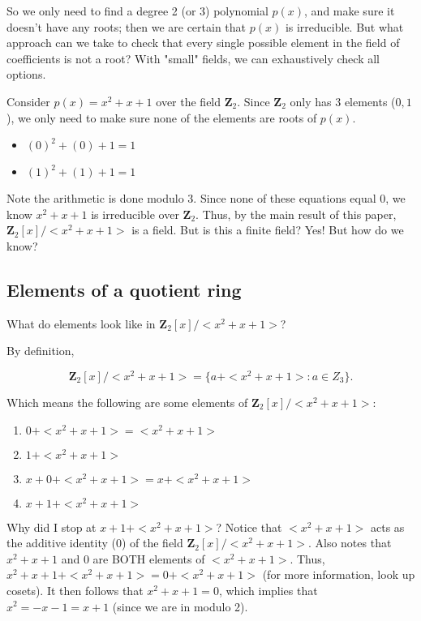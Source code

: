 So we only need to find a degree 2 (or 3) polynomial $p(x)$, and make sure it doesn't have any roots; then we are certain that $p(x)$ is irreducible. But what approach can we take to check that every single possible element in the field of coefficients is not a root? With "small" fields, we can exhaustively check all options. 

Consider $p(x) = x^2 + x + 1$ over the field $\mathbf{Z}_2$. Since $\mathbf{Z}_2$ only has 3 elements ($0, 1$), we only need to make sure none of the elements are roots of $p(x)$.

\begin{itemize}
    \item $(0)^2 + (0) + 1 = 1$
    \item $(1)^2 + (1) + 1 = 1$
\end{itemize}

Note the arithmetic is done modulo 3. Since none of these equations equal 0, we know $x^2 + x + 1$ is irreducible over $\mathbf{Z}_2$. Thus, by the main result of this paper, $\mathbf{Z}_2[x]/<x^2+x+1>$ is a field.
But is this a finite field? Yes! But how do we know?

\subsection{Elements of a quotient ring}

What do elements look like in $\mathbf{Z}_2[x]/<x^2+x+1>$? 

By definition, 

$$\mathbf{Z}_2[x]/<x^2+x+1> = \{a + <x^2 + x + 1> : a \in Z_3 \}.$$

Which means the following are some elements of $\mathbf{Z}_2[x]/<x^2+x+1>$:

\begin{enumerate}
    \item $0 + <x^2 + x + 1> = <x^2 + x + 1>$
    \item $1 + <x^2 + x + 1>$
    \item $x + 0 + <x^2 + x + 1> = x + <x^2 + x + 1>$
    \item $x + 1 + <x^2 + x + 1>$
\end{enumerate}

Why did I stop at $x + 1 + <x^2 + x + 1>$? Notice that $<x^2 + x + 1>$ acts as the additive identity (0) of the field $\mathbf{Z}_2[x]/<x^2+x+1>$. Also notes that $x^2 + x + 1$ and $0$ are BOTH elements of $<x^2 + x + 1>$. Thus, $x^2 + x + 1 + <x^2 + x + 1> = 0 + <x^2 + x + 1>$ (for more information, look up cosets). It then follows that $x^2 + x + 1 = 0$, which implies that $x^2 = -x - 1 = x + 1$ (since we are in modulo 2).

